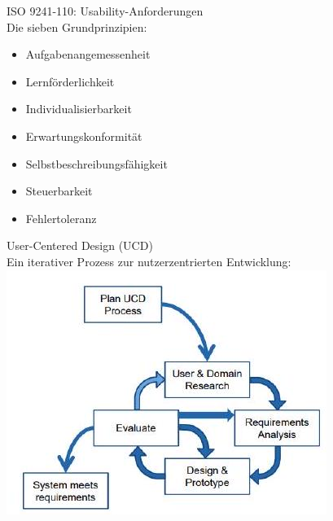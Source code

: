 \begin{theorem}{ISO 9241-110: Usability-Anforderungen}\\
Die sieben Grundprinzipien:
\begin{itemize}
    \item Aufgabenangemessenheit
    \item Lernförderlichkeit
    \item Individualisierbarkeit
    \item Erwartungskonformität
    \item Selbstbeschreibungsfähigkeit
    \item Steuerbarkeit
    \item Fehlertoleranz
\end{itemize}
\end{theorem}

\begin{concept}{User-Centered Design (UCD)}\\
Ein iterativer Prozess zur nutzerzentrierten Entwicklung:\\
\includegraphics[width=0.6\linewidth]{images/2024_12_29_0d1d7b5551ea1b4b41bdg-03}
\end{concept}
